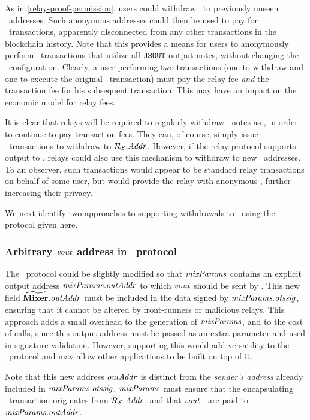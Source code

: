 As in \cref{relay-proof-permission}, users could withdraw \ether~to previously unseen \ethereum~addresses. Such anonymous addresses could then be used to pay for \zeth~transactions, apparently disconnected from any other transactions in the blockchain history. Note that this provides a means for users to anonymously perform \zeth~transactions that utilize all $\mathtt{JSOUT}$ output notes, without changing the \zeth~configuration. Clearly, a user performing two transactions (one to withdraw and one to execute the original \zeth~transaction) must pay the relay fee \emph{and} the transaction fee for his subsequent transaction. This may have an impact on the economic model for relay fees.

It is clear that relays will be required to regularly withdraw \zeth~notes as \ether, in order to continue to pay transaction fees. They can, of course, simply issue \zeth~transactions to withdraw to $\mathcal{{R}_{E}}.\mathit{Addr}$. However, if the relay protocol supports output to \ether, relays could also use this mechanism to withdraw to new \ethereum~addresses. To an observer, such transactions would appear to be standard relay transactions on behalf of some user, but would provide the relay with anonymous \ether, further increasing their privacy.

We next identify two approaches to supporting withdrawals to \ether~using the protocol given here.

\subsubsection{Arbitrary $\mathit{vout}$ address in \zeth~protocol}\label{relay-private-fees:extensions:ether-output:out-addr}

The \zeth~protocol could be slightly modified so that $\mathit{mixParams}$ contains an explicit output address  $\mathit{mixParams}.\mathit{outAddr}$ to which $\mathit{vout}$ should be sent by \mixer{}. This new field $\widetilde{\mathbf{Mixer}}.\mathit{outAddr}$ must be included in the data signed by $\mathit{mixParams}.\mathit{otssig}$, ensuring that it cannot be altered by front-runners or malicious relays. This approach adds a small overhead to the generation of $\mathit{mixParams}$, and to the cost of \mix{} calls, since this output address must be passed as an extra parameter and used in signature validation. However, supporting this would add versatility to the \zeth~protocol and may allow other applications to be built on top of it.

Note that this new address $\mathit{outAddr}$ is distinct from the \emph{sender's address} already included in $\mathit{mixParams}.\mathit{otssig}$. $\mathit{mixParams}$ must ensure that the encapsulating \ethereum~transaction originates from $\mathcal{{R}_{E}}.\mathit{Addr}$, and that $\mathit{vout}$ \ether~are paid to $\mathit{mixParams}.\mathit{outAddr}$.

